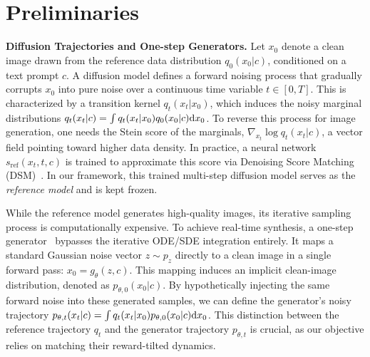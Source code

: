 \section{Preliminaries}\label{sec:background}

\textbf{Diffusion Trajectories and One-step Generators.} Let $x_0$ denote a clean image drawn from the reference data distribution $q_0(x_0|c)$, conditioned on a text prompt $c$. A diffusion model defines a forward noising process that gradually corrupts $x_0$ into pure noise over a continuous time variable $t \in [0, T]$. This is characterized by a transition kernel $q_t(x_t|x_0)$, which induces the noisy marginal distributions $q_t(x_t|c) = \int q_t(x_t|x_0)q_0(x_0|c)\mathrm{d} x_0$. To reverse this process for image generation, one needs the Stein score of the marginals, $\nabla_{x_t}\log q_t(x_t|c)$, a vector field pointing toward higher data density. In practice, a neural network $s_{\mathrm{ref}}(x_t, t, c)$ is trained to approximate this score via Denoising Score Matching (DSM)~\citep{vincent2011connection,song2021scorebased}. In our framework, this trained multi-step diffusion model serves as the \emph{reference model} and is kept frozen.

While the reference model generates high-quality images, its iterative sampling process is computationally expensive. To achieve real-time synthesis, a one-step generator~\citep{goodfellow2014generative,song2023consistency} bypasses the iterative ODE/SDE integration entirely. It maps a standard Gaussian noise vector $z \sim p_z$ directly to a clean image in a single forward pass: $x_0 = g_\theta(z, c)$. This mapping induces an implicit clean-image distribution, denoted as $p_{\theta,0}(x_0|c)$. By hypothetically injecting the same forward noise into these generated samples, we can define the generator's noisy trajectory $p_{\theta,t}(x_t|c) = \int q_t(x_t|x_0)p_{\theta,0}(x_0|c)\mathrm{d} x_0$. This distinction between the reference trajectory $q_t$ and the generator trajectory $p_{\theta,t}$ is crucial, as our objective relies on matching their reward-tilted dynamics.

